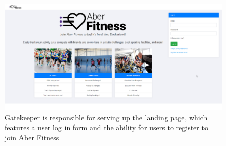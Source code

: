\begin{figure}[H]
    \centering
    \includegraphics[width=\textwidth]{Images/service_landing_page.png}
    \caption{Gatekeeper is responsible for serving up the landing page, which features a user log in form and the ability for users to register to join Aber Fitness}
\end{figure}